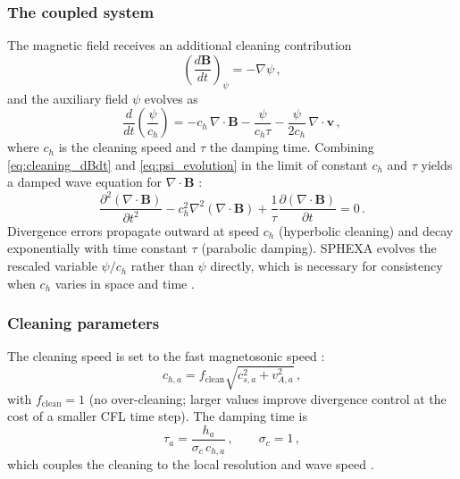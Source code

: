 \subsubsection*{The coupled system}

The magnetic field receives an additional cleaning contribution
\begin{equation}
    \left(\frac{d\mathbf{B}}{dt}\right)_\psi = -\nabla \psi\,,
    \label{eq:cleaning_dBdt}
\end{equation}
and the auxiliary field $\psi$ evolves as
\begin{equation}
    \frac{d}{dt}\!\left(\frac{\psi}{c_h}\right) = -c_h \, \nabla \cdot \mathbf{B} - \frac{\psi}{c_h \tau} - \frac{\psi}{2c_h}\, \nabla \cdot \mathbf{v}\,,
    \label{eq:psi_evolution}
\end{equation}
where $c_h$ is the cleaning speed and $\tau$ the damping time. Combining \eqref{eq:cleaning_dBdt} and \eqref{eq:psi_evolution} in the limit of constant $c_h$ and $\tau$ yields a damped wave equation for $\nabla \cdot \mathbf{B}$ \cite{TriccoPrice2012}:
\begin{equation}
    \frac{\partial^2 (\nabla \cdot \mathbf{B})}{\partial t^2} - c_h^2 \nabla^2(\nabla \cdot \mathbf{B}) + \frac{1}{\tau}\frac{\partial(\nabla \cdot \mathbf{B})}{\partial t} = 0\,.
    \label{eq:divb_wave}
\end{equation}
Divergence errors propagate outward at speed $c_h$ (hyperbolic cleaning) and decay exponentially with time constant $\tau$ (parabolic damping). SPHEXA evolves the rescaled variable $\psi/c_h$ rather than $\psi$ directly, which is necessary for consistency when $c_h$ varies in space and time \cite{Tricco2016}.


\subsubsection*{Cleaning parameters}

The cleaning speed is set to the fast magnetosonic speed \cite{Wissing2020}:
\begin{equation}
    c_{h,a} = f_\mathrm{clean} \sqrt{c_{s,a}^2 + v_{A,a}^2}\,,
    \label{eq:ch}
\end{equation}
with $f_\mathrm{clean} = 1$ (no over-cleaning; larger values improve divergence control at the cost of a smaller CFL time step). The damping time is
\begin{equation}
    \tau_a = \frac{h_a}{\sigma_c \, c_{h,a}}\,, \qquad \sigma_c = 1\,,
    \label{eq:tau_cleaning}
\end{equation}
which couples the cleaning to the local resolution and wave speed \cite{TriccoPrice2012}.



